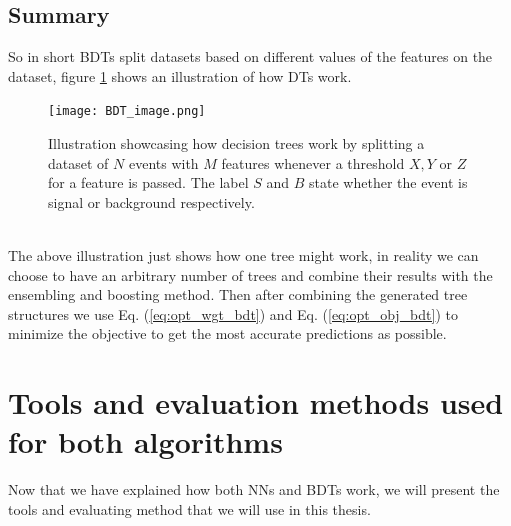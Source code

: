 \documentclass[12pt, a4paper]{book}
\begin{document}
\subsection{Summary}
So in short BDTs split datasets based on different values of the features on the dataset, figure \ref{fig:DT_ilus} shows an illustration of how DTs work.
\graphicspath{{../../figures/}}
\begin{figure}[!ht]
	\centering
    \texttt{[image: BDT\_image.png]}
    \caption[Basic Decision Tree illustration]{Illustration showcasing how decision trees work by splitting a dataset of $N$ events with $M$ features whenever a threshold $X, Y$ or $Z$ for a feature is passed. The label $S$ and $B$ state whether the event is signal or background respectively.}\label{fig:DT_ilus}
\end{figure}
\\The above illustration just shows how one tree might work, in reality we can choose to have an arbitrary number of trees and combine their results with the ensembling and boosting method. Then after combining the generated tree structures we use Eq. (\ref{eq:opt_wgt_bdt}) and Eq. (\ref{eq:opt_obj_bdt}) 
to minimize the objective to get the most accurate predictions as possible. 

\clearpage
\section{Tools and evaluation methods used for both algorithms}\label{sec:tools}
Now that we have explained how both NNs and BDTs work, we will present the tools and evaluating method that we will use in this thesis. 
\end{document}
